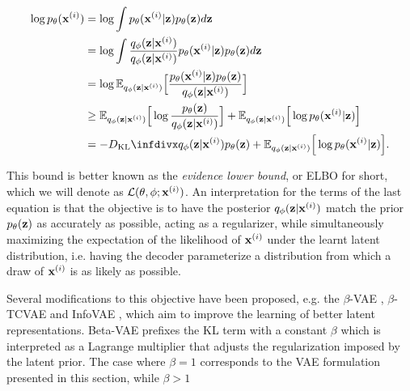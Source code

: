 \begin{equation}
\begin{aligned}
\log \ptheta(\bxi) & = \log \int \ptheta(\bxi \vert \bz) \ptheta(\bz) d\bz \\
                   & = \log \int \frac{\qphi(\bz \vert \bxi)}{\qphi(\bz \vert \bxi)} \ptheta(\bxi \vert \bz) \ptheta(\bz) d\bz \\
                   & = \log \mathbb{E}_{\qphi(\bz \vert \bxi)}\Big[\frac{\ptheta(\bxi \vert \bz) \ptheta(\bz)}{\qphi(\bz \vert \bxi)}\Big] \\
                   & \geq \mathbb{E}_{\qphi(\bz \vert \bxi)}\Big[\log \frac{\ptheta(\bz)}{\qphi(\bz \vert \bxi)}\Big] + \mathbb{E}_{\qphi(\bz \vert \bxi)}\Big[\log \ptheta(\bxi \vert \bz)\Big] \\
                   & = -\dkl{\qphi(\bz \vert \bxi)}{\ptheta(\bz)} + \mathbb{E}_{\qphi(\bz \vert \bxi)}\Big[\log \ptheta(\bxi \vert \bz)\Big].
\end{aligned}
\end{equation}

This bound is better known as the \textit{evidence lower bound}, or ELBO for short, which we will denote as $\mathcal{L}(\theta, \phi; \mathbf{x}^{(i)})$. An interpretation for the terms of the last equation is that the objective is to have the posterior $q_{\phi}(\mathbf{z} \vert \mathbf{x}^{(i)})$ match the prior $p_{\theta}(\mathbf{z})$ as accurately as possible, acting as a regularizer, while simultaneously maximizing the expectation of the likelihood of $\mathbf{x}^{(i)}$ under the learnt latent distribution, i.e. having the decoder parameterize a distribution from which a draw of $\mathbf{x}^{(i)}$ is as likely as possible.

Several modifications to this objective have been proposed, e.g. the $\beta$-VAE \cite{beta_vae, understanding_beta_vae}, $\beta$-TCVAE \cite{beta_tcvae} and InfoVAE \cite{infovae}, which aim to improve the learning of better latent representations. Beta-VAE prefixes the KL term with a constant $\beta$ which is interpreted as a Lagrange multiplier that adjusts the regularization imposed by the latent prior. The case where $\beta = 1$ corresponds to the VAE formulation presented in this section, while $\beta > 1$ 

